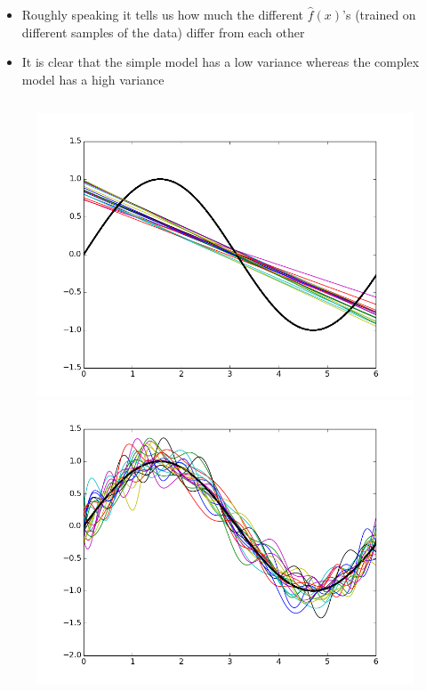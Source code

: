 \begin{frame}
\begin{columns}
\begin{column}{0.6\textwidth}
\begin{itemize}
				
										
				\item<2->Roughly speaking it tells us how much the different $\hat{f}(x)$'s (trained on different samples of the data) differ from each other
										
				\item<3-> It is clear that the simple model has a low variance whereas the complex model has a high variance
			\end{itemize}
		\end{column}
	\end{columns}
\end{frame}
\begin{frame}
	\begin{columns}
		\begin{column}{0.4\textwidth}
			\begin{figure}
				\centering
				\includegraphics[width=0.9\linewidth]{images/linear/19am.png}\\
				\includegraphics[width=0.9\linewidth]{images/complex/19bm.png}

\end{figure}
\end{column}
\end{columns}
\end{frame}
